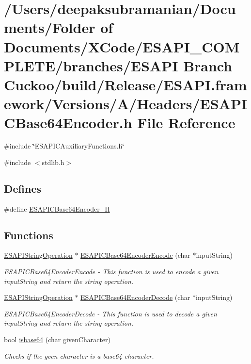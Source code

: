 \hypertarget{a00006}{
\section{/Users/deepaksubramanian/Documents/Folder of Documents/XCode/ESAPI\_\-COMPLETE/branches/ESAPI Branch Cuckoo/build/Release/ESAPI.framework/Versions/A/Headers/ESAPICBase64Encoder.h File Reference}
\label{de/d21/a00006}
}
{\ttfamily \#include \char`\"{}ESAPICAuxiliaryFunctions.h\char`\"{}}\par
{\ttfamily \#include $<$stdlib.h$>$}\par
\subsection*{Defines}
\begin{DoxyCompactItemize}
\item 
\#define \hyperlink{a00006_a9a3f479a4a67e06261402416657952b8}{ESAPICBase64Encoder\_\-H}
\end{DoxyCompactItemize}
\subsection*{Functions}
\begin{DoxyCompactItemize}
\item 
\hyperlink{a00002}{ESAPIStringOperation} $\ast$ \hyperlink{a00006_a89aaefabce9c6d0abf9bfa83d53c2126}{ESAPICBase64EncoderEncode} (char $\ast$inputString)
\begin{DoxyCompactList}\small\item\em ESAPICBase64EncoderEncode -\/ This function is used to encode a given inputString and return the string operation. \end{DoxyCompactList}\item 
\hyperlink{a00002}{ESAPIStringOperation} $\ast$ \hyperlink{a00006_a3be3ccff3afe8d96d3e381febc3b61c4}{ESAPICBase64EncoderDecode} (char $\ast$inputString)
\begin{DoxyCompactList}\small\item\em ESAPICBase64EncoderDecode -\/ This function is used to decode a given inputString and return the string operation. \end{DoxyCompactList}\item 
bool \hyperlink{a00006_afaf89639d27c67e0a3ee705d9d170fc0}{isbase64} (char givenCharacter)
\begin{DoxyCompactList}\small\item\em Checks if the gven character is a base64 character. \end{DoxyCompactList}\end{DoxyCompactItemize}


